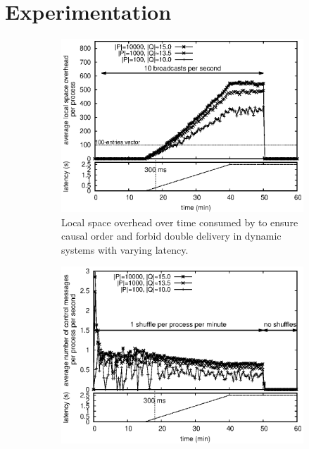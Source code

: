 
\section{Experimentation}
\label{sec:experimentation}


\begin{figure}
  \begin{center}
    \begin{subfigure}{0.495\textwidth}
    \includegraphics[width=1\textwidth]{./img/overhead.eps}
    \caption{\label{fig:overhead}Local space overhead over time consumed by
      \RPCBROADCAST to ensure causal order and forbid double delivery in dynamic
      systems with varying latency.}    
    \end{subfigure}
    \begin{subfigure}{0.495\textwidth}      
      \includegraphics[width=1\textwidth]{./img/controlmessages.eps}

\end{subfigure}
\end{center}
\end{figure}
